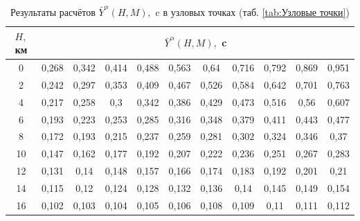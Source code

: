 \begin{table}[H]
    \centering
    \caption{Результаты расчётов $\bar{Y}^{\alpha}(H,M), $ c в узловых точках (таб. \ref{tab:Узловые точки})}
    \label{tab:Результаты расчётов $q(H,M),$Н/м$^2$}
    \begin{tabular}{|c|c|c|c|c|c|c|c|c|c|c|}
    \hline
        $H,$ км &\multicolumn{10}{|c|}{$\bar{Y}^{\alpha}(H,M), $ c }\\ \hline
        0 & 0,268 & 0,342 & 0,414 & 0,488 & 0,563 & 0,64 & 0,716 & 0,792 & 0,869 & 0,951  \\ \hline
        2 & 0,242 & 0,297 & 0,353 & 0,409 & 0,467 & 0,526 & 0,584 & 0,642 & 0,701 & 0,763  \\ \hline
        4 & 0,217 & 0,258 & 0,3 & 0,342 & 0,386 & 0,429 & 0,473 & 0,516 & 0,56 & 0,607  \\ \hline
        6 & 0,193 & 0,223 & 0,253 & 0,285 & 0,316 & 0,348 & 0,379 & 0,411 & 0,443 & 0,477  \\ \hline
        8 & 0,172 & 0,193 & 0,215 & 0,237 & 0,259 & 0,281 & 0,302 & 0,324 & 0,346 & 0,37  \\ \hline
        10 & 0,147 & 0,162 & 0,177 & 0,192 & 0,207 & 0,222 & 0,236 & 0,251 & 0,267 & 0,283  \\ \hline
        12 & 0,131 & 0,14 & 0,148 & 0,157 & 0,166 & 0,174 & 0,183 & 0,192 & 0,201 & 0,21  \\ \hline
        14 & 0,115 & 0,12 & 0,124 & 0,128 & 0,132 & 0,136 & 0,14 & 0,145 & 0,149 & 0,154  \\ \hline
        16 & 0,102 & 0,103 & 0,104 & 0,105 & 0,106 & 0,108 & 0,109 & 0,11 & 0,111 & 0,112  \\ \hline
    \end{tabular}
\end{table}

